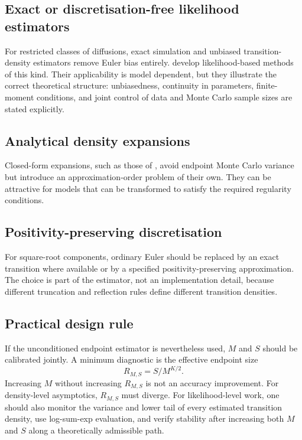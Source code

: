 \documentclass[11pt]{article}
\theoremstyle{definition}
\begin{document}
\subsection{Exact or discretisation-free likelihood estimators}

For restricted classes of diffusions, exact simulation and unbiased transition-density estimators remove Euler bias entirely. \citet{BeskosEtAl2006,BeskosEtAl2009} develop likelihood-based methods of this kind. Their applicability is model dependent, but they illustrate the correct theoretical structure: unbiasedness, continuity in parameters, finite-moment conditions, and joint control of data and Monte Carlo sample sizes are stated explicitly.

\subsection{Analytical density expansions}

Closed-form expansions, such as those of \citet{AitSahalia2002}, avoid endpoint Monte Carlo variance but introduce an approximation-order problem of their own. They can be attractive for models that can be transformed to satisfy the required regularity conditions.

\subsection{Positivity-preserving discretisation}

For square-root components, ordinary Euler should be replaced by an exact transition where available or by a specified positivity-preserving approximation. The choice is part of the estimator, not an implementation detail, because different truncation and reflection rules define different transition densities.

\subsection{Practical design rule}

If the unconditioned endpoint estimator is nevertheless used, $M$ and $S$ should be calibrated jointly. A minimum diagnostic is the effective endpoint size
\[
R_{M,S}=S/M^{K/2}.
\]
Increasing $M$ without increasing $R_{M,S}$ is not an accuracy improvement. For density-level asymptotics, $R_{M,S}$ must diverge. For likelihood-level work, one should also monitor the variance and lower tail of every estimated transition density, use log-sum-exp evaluation, and verify stability after increasing both $M$ and $S$ along a theoretically admissible path.
\end{document}
